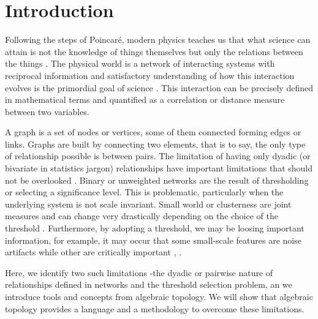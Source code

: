 \documentclass[onecollarge,runningheads]{svjour2}
\begin{document}
\section{Introduction}

Following the steps of Poincar{\'e}, modern physics teaches us that what science can attain is not the knowledge of things themselves but only the relations between the things \cite{Poincare:1952}. The physical world is a network of interacting systems with reciprocal information and satisfactory understanding of how this interaction evolves is the primordial goal of science \cite{rovelli2015relative}.
This interaction can be precisely defined in mathematical terms and quantified as a correlation or distance measure between two variables. 

A graph is a set of nodes or vertices, some of them connected forming edges or links. Graphs are built by connecting two elements, that is to say, the only type of relationship possible is between pairs. The limitation of having only dyadic (or bivariate in statistics jargon) relationships have important limitations that should not be overlooked \cite{giusti2016two}. 
Binary or unweighted networks are the result of thresholding or selecting a significance level. This is problematic, particularly when the underlying system is not scale invariant. Small world or clusterness are joint measures and can change very drastically depending on the choice of the threshold \cite{toppi2012statistical}. Furthermore, by adopting a threshold, we may be loosing important information, for example, it may occur that some small-scale features are noise artifacts while other are critically important \cite{fallani2014graph}, \cite{papo2014complex}.

Here, we identify two such limitations -the dyadic or pairwise nature of relationships defined in networks and the threshold selection problem, an we introduce tools and concepts from algebraic topology.
We will show that algebraic topology \cite{munkres1984elements} provides a language and a methodology to overcome these limitations. 
\end{document}
